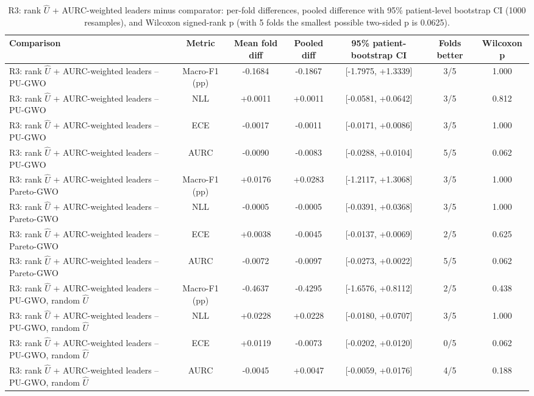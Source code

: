 \begin{table}[t]
\centering
\caption{R3: rank $\hat{U}$ + AURC-weighted leaders minus comparator: per-fold differences, pooled difference with 95\% patient-level bootstrap CI (1000 resamples), and Wilcoxon signed-rank p (with 5 folds the smallest possible two-sided p is 0.0625).}
\label{tab:table11_paired_statistics}
\small
\begin{tabular}{lcccccc}
\toprule
Comparison & Metric & Mean fold diff & Pooled diff & 95\% patient-bootstrap CI & Folds better & Wilcoxon p \\
\midrule
R3: rank $\hat{U}$ + AURC-weighted leaders -- PU-GWO & Macro-F1 (pp) & -0.1684 & -0.1867 & [-1.7975, +1.3339] & 3/5 & 1.000 \\
R3: rank $\hat{U}$ + AURC-weighted leaders -- PU-GWO & NLL & +0.0011 & +0.0011 & [-0.0581, +0.0642] & 3/5 & 0.812 \\
R3: rank $\hat{U}$ + AURC-weighted leaders -- PU-GWO & ECE & -0.0017 & -0.0011 & [-0.0171, +0.0086] & 3/5 & 1.000 \\
R3: rank $\hat{U}$ + AURC-weighted leaders -- PU-GWO & AURC & -0.0090 & -0.0083 & [-0.0288, +0.0104] & 5/5 & 0.062 \\
R3: rank $\hat{U}$ + AURC-weighted leaders -- Pareto-GWO & Macro-F1 (pp) & +0.0176 & +0.0283 & [-1.2117, +1.3068] & 3/5 & 1.000 \\
R3: rank $\hat{U}$ + AURC-weighted leaders -- Pareto-GWO & NLL & -0.0005 & -0.0005 & [-0.0391, +0.0368] & 3/5 & 1.000 \\
R3: rank $\hat{U}$ + AURC-weighted leaders -- Pareto-GWO & ECE & +0.0038 & -0.0045 & [-0.0137, +0.0069] & 2/5 & 0.625 \\
R3: rank $\hat{U}$ + AURC-weighted leaders -- Pareto-GWO & AURC & -0.0072 & -0.0097 & [-0.0273, +0.0022] & 5/5 & 0.062 \\
R3: rank $\hat{U}$ + AURC-weighted leaders -- PU-GWO, random $\hat{U}$ & Macro-F1 (pp) & -0.4637 & -0.4295 & [-1.6576, +0.8112] & 2/5 & 0.438 \\
R3: rank $\hat{U}$ + AURC-weighted leaders -- PU-GWO, random $\hat{U}$ & NLL & +0.0228 & +0.0228 & [-0.0180, +0.0707] & 3/5 & 1.000 \\
R3: rank $\hat{U}$ + AURC-weighted leaders -- PU-GWO, random $\hat{U}$ & ECE & +0.0119 & -0.0073 & [-0.0202, +0.0120] & 0/5 & 0.062 \\
R3: rank $\hat{U}$ + AURC-weighted leaders -- PU-GWO, random $\hat{U}$ & AURC & -0.0045 & +0.0047 & [-0.0059, +0.0176] & 4/5 & 0.188 \\

\end{tabular}
\end{table}
